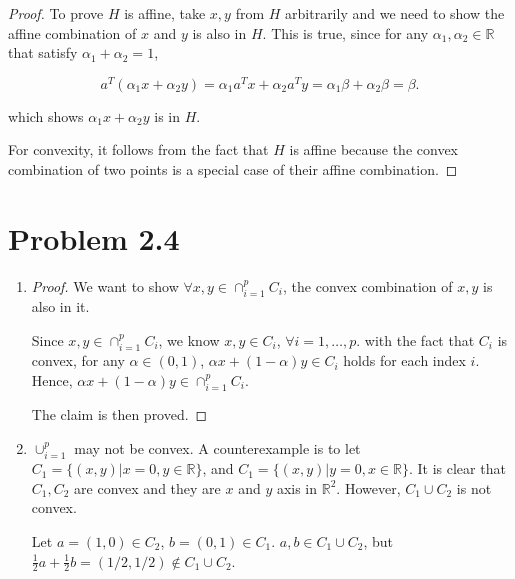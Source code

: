 \documentclass[12pt]{article}
\begin{document}
\begin{proof}

To prove $H$ is affine, take $x, y$ from $H$ arbitrarily and we need to show the affine combination of $x$ and $y$ is also in $H$. This is true, since for any $\alpha_1, \alpha_2 \in \mathbb{R}$ that satisfy $\alpha_1 + \alpha_2  =1$, 

$$
a^T(\alpha_1 x + \alpha_2 y) = \alpha_1 a^T x + \alpha_2 a^T y = \alpha_1\beta + \alpha_2 \beta = \beta.
$$

which shows $\alpha_1 x + \alpha_2 y$ is in $H$.

For convexity, it follows from the fact that $H$ is affine because the convex combination of two points is a special case of their affine combination.

\end{proof}


\section*{Problem 2.4}

\begin{enumerate}
\item

\begin{proof}

We want to show $\forall x, y \in \cap_{i = 1}^ p C_i$, the convex combination of $x, y$ is also in it.

Since $x, y \in \cap_{i = 1}^ p C_i$, we know $x, y \in C_i$, $\forall i = 1,\dots, p$. with the fact that $C_i$ is convex, for any $\alpha \in (0, 1)$, $\alpha x + (1-\alpha) y \in C_i$ holds for each index $i$. Hence, $\alpha x + (1-\alpha) y \in \cap_{i=1} ^ p C_i$. 

The claim is then proved.

\end{proof}

\item
$\cup_{i=1}^p$ may not be convex. A counterexample is to let $C_1 = \{(x, y)| x = 0, y\in\mathbb{R}\}$, and $C_1 = \{(x, y)| y = 0, x\in\mathbb{R}\}$. It is clear that $C_1, C_2$ are convex and they are $x$ and $y$ axis in $\mathbb{R}^2$. However, $C_1\cup C_2$ is not convex. 

Let $a = (1, 0) \in C_2$, $b = (0, 1)\in C_1$. $a, b \in C_1\cup C_2$, but $\frac{1}{2} a + \frac{1}{2}b = (1/2, 1/2) \notin C_1\cup C_2$.

\end{enumerate}
\end{document}

